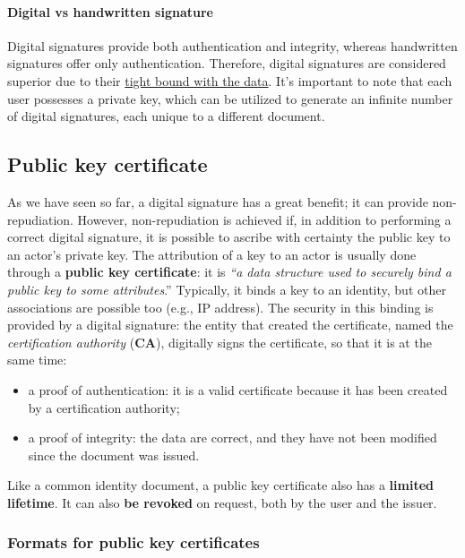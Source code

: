 \paragraph{Digital vs handwritten signature}
Digital signatures provide both authentication and integrity, whereas handwritten signatures offer only authentication. Therefore, digital signatures are considered superior due to their \underline{tight bound with the data}. It's important to note that each user possesses a private key, which can be utilized to generate an infinite number of digital signatures, each unique to a different document.


\subsection{Public key certificate}\label{chap:public-key-certificate}
As we have seen so far, a digital signature has a great benefit; it can provide non-repudiation. 
However, non-repudiation is achieved if, in addition to performing a correct digital signature, it is possible to ascribe with certainty the public key to an actor's private key. 
The attribution of a key to an actor is usually done through a \textbf{public key certificate}: it is \textit{“a data structure used to securely bind a public key to some attributes}.” 
Typically, it binds a key to an identity, but other associations are possible too (e.g., IP address). 
The security in this binding is provided by a digital signature: the entity that created the certificate, named the \textit{certification authority} (\textbf{CA}), digitally signs the certificate, so that it is at the same time:
\begin{itemize}
    \item a proof of authentication: it is a valid certificate because it has been created by a certification authority;
    \item a proof of integrity: the data are correct, and they have not been modified since the document was issued.
\end{itemize}

Like a common identity document, a public key certificate also has a \textbf{limited lifetime}. It can also \textbf{be
revoked} on request, both by the user and the issuer.

\subsubsection{Formats for public key certificates}

